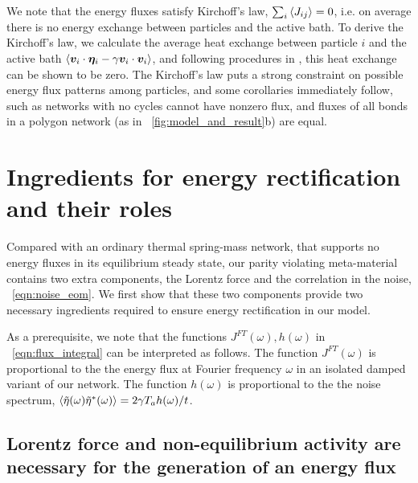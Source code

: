 \documentclass[
 preprint,
 preprintnumbers,
 amsmath,amssymb,
 aps,
 pre,
 longbibliography,
 superscriptaddress,
 10pt, twocolumn
]{revtex4-1}
\begin{document}
We note that the energy fluxes satisfy Kirchoff's law, $\sum_i \expval{J_{ij}} = 0$, i.e. on average there is no energy exchange between particles and the active bath. To derive the Kirchoff's law, we calculate the average heat exchange between particle $i$ and the active bath $\expval{\bm{v}_i \cdot \bm{\eta}_i - \gamma \bm{v}_i \cdot \bm{v}_i}$, and following procedures in \cite{Kundu2011LargeDeviations}, this heat exchange can be shown to be zero.
The Kirchoff's law puts a strong constraint on possible energy flux patterns among particles, and some corollaries immediately follow, such as networks with no cycles cannot have nonzero flux, and fluxes of all bonds in a polygon network (as in \figurename~\ref{fig:model_and_result}b) are equal.


\section{Ingredients for energy rectification and their roles} \label{sec:fourier}

Compared with an ordinary thermal spring-mass network, that supports no energy fluxes in its equilibrium steady state, our parity violating meta-material contains two extra components, the Lorentz force and the correlation in the noise, \eqnname~\ref{eqn:noise_eom}.
We first show that these two components provide two necessary ingredients required to ensure energy rectification in our model.

As a prerequisite, we note that the functions $J^{FT}(\omega), h(\omega)$ in \eqnname~\eqref{eqn:flux_integral} can be interpreted as follows.
The function $J^{FT}(\omega)$ is proportional to the the energy flux at Fourier frequency $\omega$ in an isolated damped variant of our network.
The function $h(\omega)$ is proportional to the the noise spectrum, $\expval{\tilde{\eta}(\omega)\tilde{\eta}^*(\omega)} = 2\gamma T_a h(\omega) / t$.


\subsection{Lorentz force and non-equilibrium activity are necessary for the generation of an energy flux} 
\end{document}

